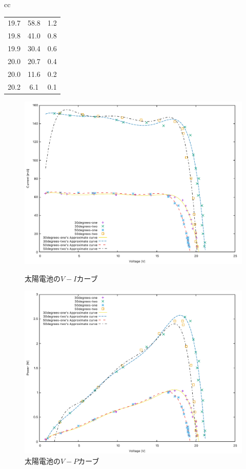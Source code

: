 \begin{itemize}
\begin{table}[p]
\begin{tabular}{cc}
\begin{minipage}[t]{0.5\hsize}
{\begin{tabular}{ccc}
	19.7 & 58.8  & 1.2 \\
	19.8 & 41.0  & 0.8 \\
	19.9 & 30.4  & 0.6 \\
	20.0 & 20.7  & 0.4 \\
	20.0 & 11.6  & 0.2 \\
	20.2 & 6.1   & 0.1 \\
	\hline
	\end{tabular}
	}
	\end{minipage}
	\end{tabular}
	\end{table}
	\begin{figure}[h]
	\begin{minipage}[c]{1.0\hsize}
	\centering
	\includegraphics[scale=0.7]{./data/solar-cell/solar-cell.pdf}
	\caption{太陽電池の$V-I$カーブ}
	\label{fig:VIc}
	\end{minipage}
	\begin{minipage}{1.0\hsize}
	\centering
	\includegraphics[scale=0.7]{./data/solar-cell/solar-cell-2.pdf}
	\caption{太陽電池の$V-P$カーブ}
	\label{fig:VPc}
	\end{minipage}
	\end{figure}
\end{itemize}

